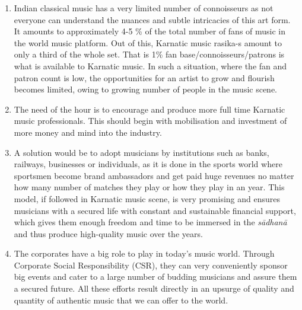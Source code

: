 \begin{enumerate}
\begin{enumerate}
 \item Indian classical music has a very limited number of connoisseurs as not everyone can understand the nuances and subtle intricacies of this art form. It amounts to approximately 4-5 \% of the total number of fans of music in the world music platform. Out of this, Karnatic music rasika-s amount to only a third of the whole set. That is 1\% fan base/connoisseurs/patrons is what is available to Karnatic music. In such a situation, where the fan and patron count is low, the opportunities for an artist to grow and flourish becomes limited, owing to growing number of people in the music scene. %

 \item The need of the hour is to encourage and produce more full time Karnatic music professionals. This should begin with mobilisation and investment of more money and mind into the industry.

 \item A solution would be to adopt musicians by institutions such as banks, railways, businesses or individuals, as it is done in the sports world where sportsmen become brand ambassadors and get paid huge revenues no matter how many number of matches they play or how they play in an year. This model, if followed in Karnatic music scene, is very promising and ensures musicians with a secured life with constant and sustainable financial support, which gives them enough freedom and time to be immersed in the \textit{sādhanā} and thus produce high-quality music over the years.

 \item The corporates have a big role to play in today’s music world. Through Corporate Social Responsibility (CSR), they can very conveniently sponsor big events and cater to a large number of budding musicians and assure them a secured future. All these efforts result directly in an upsurge of quality and quantity of authentic music that we can offer to the world.
\end{enumerate}



\end{enumerate}
